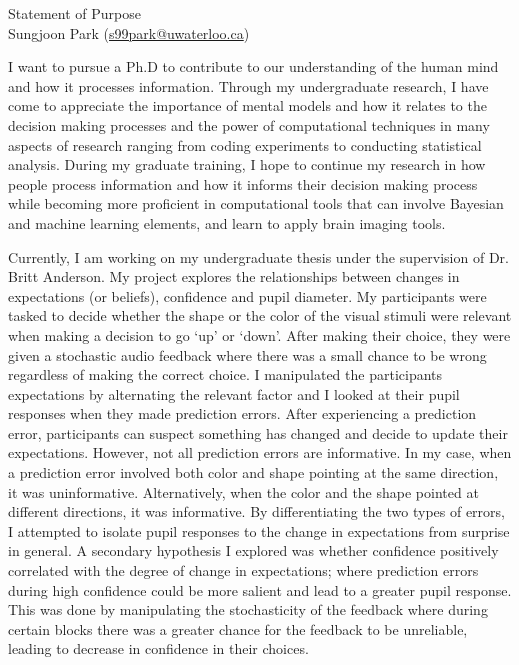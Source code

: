 \documentclass[12pt]{article}
\let\oldcenter\center
\let\oldendcenter\endcenter
\renewenvironment{center}{\setlength\topsep{-1pt}\oldcenter}{\oldendcenter}
\begin{document}
	
	\begin{center}
		{\Large Statement of Purpose} \\
		{\normalsize Sungjoon Park (\href{mailto:s99park@uwaterloo.ca}{s99park@uwaterloo.ca})}
	\end{center}
	
	I want to pursue a Ph.D to contribute to our understanding of the human mind and how it processes information. Through my undergraduate research, I have come to appreciate the importance of mental models and how it relates to the decision making processes and the power of computational techniques in many aspects of research ranging from coding experiments to conducting statistical analysis. During my graduate training, I hope to continue my research in how people process information and how it informs their decision making process while becoming more proficient in computational tools that can involve Bayesian and machine learning elements, and learn to apply brain imaging tools.
	
	Currently, I am working on my undergraduate thesis under the supervision of Dr. Britt Anderson. My project explores the relationships between changes in expectations (or beliefs), confidence and pupil diameter. My participants were tasked to decide whether the shape or the color of the visual stimuli were relevant when making a decision to go `up' or `down'. After making their choice, they were given a stochastic audio feedback where there was a small chance to be wrong regardless of making the correct choice. I manipulated the participants expectations by alternating the relevant factor and I looked at their pupil responses when they made prediction errors. After experiencing a prediction error, participants can suspect something has changed and decide to update their expectations. However, not all prediction errors are informative. In my case, when a prediction error involved both color and shape pointing at the same direction, it was uninformative. Alternatively, when the color and the shape pointed at different directions, it was informative. By differentiating the two types of errors, I attempted to isolate pupil responses to the change in expectations from surprise in general. A secondary hypothesis I explored was whether confidence positively correlated with the degree of change in expectations; where prediction errors during high confidence could be more salient and lead to a greater pupil response. This was done by manipulating the stochasticity of the feedback where during certain blocks there was a greater chance for the feedback to be unreliable, leading to decrease in confidence in their choices.
	
\end{document}
